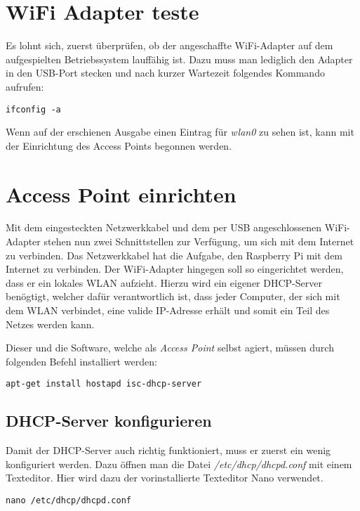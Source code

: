 \section{WiFi Adapter teste}
Es lohnt sich, zuerst überprüfen, ob der angeschaffte WiFi-Adapter auf dem aufgespielten Betriebssystem lauffähig ist. Dazu muss man lediglich den Adapter in den USB-Port stecken und nach kurzer Wartezeit folgendes Kommando aufrufen:

\begin{lstlisting}
ifconfig -a
\end{lstlisting}

Wenn auf der erschienen Ausgabe einen Eintrag für \textit{wlan0} zu sehen ist, kann mit der Einrichtung des Access Points begonnen werden.


\section{Access Point einrichten}
Mit dem eingesteckten Netzwerkkabel und dem per USB angeschlossenen WiFi-Adapter stehen nun zwei Schnittstellen zur Verfügung, um sich mit dem Internet zu verbinden. Das Netzwerkkabel hat die Aufgabe, den Raspberry Pi mit dem Internet zu verbinden. Der WiFi-Adapter hingegen soll so eingerichtet werden, dass er ein lokales WLAN aufzieht.
Hierzu wird ein eigener DHCP-Server benögtigt, welcher dafür verantwortlich ist, dass jeder Computer, der sich mit dem WLAN verbindet, eine valide IP-Adresse erhält und somit ein Teil des Netzes werden kann.


Dieser und die Software, welche als \textit{Access Point} selbst agiert, müssen durch folgenden Befehl installiert werden:
 
\begin{lstlisting}
apt-get install hostapd isc-dhcp-server
\end{lstlisting}

\subsection{DHCP-Server konfigurieren}
Damit der DHCP-Server auch richtig funktioniert, muss er zuerst ein wenig konfiguriert werden.
Dazu öffnen man die Datei \textit{/etc/dhcp/dhcpd.conf} mit einem Texteditor. Hier wird dazu der vorinstallierte Texteditor Nano verwendet.

\begin{lstlisting}
nano /etc/dhcp/dhcpd.conf
\end{lstlisting}


